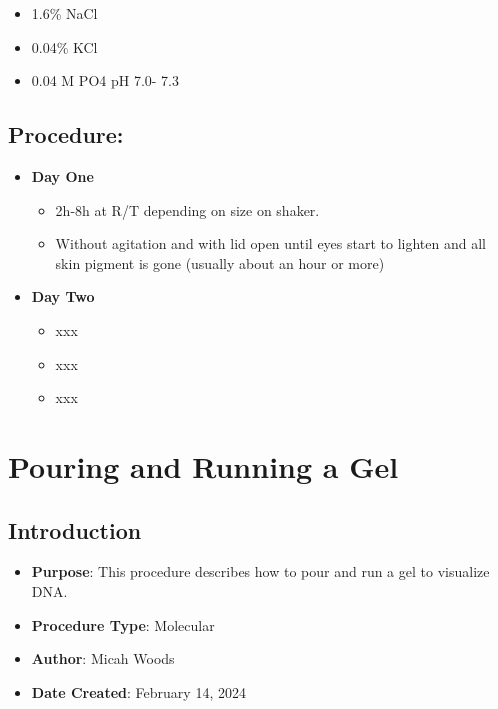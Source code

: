 \documentclass[
  letterpaper,
  DIV=11,
  numbers=noendperiod]{scrreprt}
\providecommand{\tightlist}{%
  \setlength{\itemsep}{0pt}\setlength{\parskip}{0pt}}\usepackage{longtable,booktabs,array}
\begin{document}
\begin{itemize}
  \begin{itemize}
  \tightlist
  \item
    1.6\% NaCl
  \item
    0.04\% KCl
  \item
    0.04 M PO4 pH 7.0- 7.3
  \end{itemize}
\end{itemize}

\hypertarget{procedure-4}{%
\section{Procedure:}\label{procedure-4}}

\begin{itemize}
\tightlist
\item
  \textbf{Day One}

  \begin{itemize}
  \tightlist
  \item
    2h-8h at R/T depending on size on shaker.
  \item
    Without agitation and with lid open until eyes start to lighten and
    all skin pigment is gone (usually about an hour or more)
  \end{itemize}
\item
  \textbf{Day Two}

  \begin{itemize}
  \tightlist
  \item
    xxx
  \item
    xxx
  \item
    xxx
  \end{itemize}
\end{itemize}

\hypertarget{pouring-and-running-a-gel}{%
\chapter{Pouring and Running a Gel}\label{pouring-and-running-a-gel}}

\hypertarget{introduction-5}{%
\section{Introduction}\label{introduction-5}}

\begin{itemize}
\tightlist
\item
  \textbf{Purpose}: This procedure describes how to pour and run a gel
  to visualize DNA.
\item
  \textbf{Procedure Type}: Molecular
\item
  \textbf{Author}: Micah Woods
\item
  \textbf{Date Created}: February 14, 2024
\end{itemize}
\end{document}
